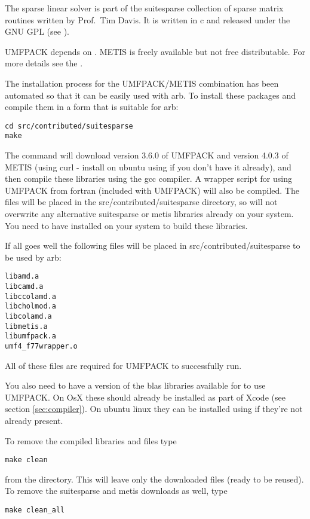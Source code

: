 The  sparse linear solver is part of the suitesparse collection of sparse matrix routines written by Prof.~Tim Davis.  It is written in c and released under the GNU GPL (see ).

UMFPACK depends on .  METIS is freely available but not free distributable.  For more details see the .

The installation process for the UMFPACK/METIS combination has been automated so that it can be easily used with arb.  To install these packages and compile them in a form that is suitable for arb:
%
\begin{verbatim}
cd src/contributed/suitesparse
make
\end{verbatim}

The  command will download version 3.6.0 of UMFPACK and version 4.0.3 of METIS (using curl - install on ubuntu using  if you don't have it already), and then compile these libraries using the gcc compiler.  A wrapper script for using UMFPACK from fortran (included with UMFPACK) will also be compiled.  The files will be placed in the src/contributed/suitesparse directory, so will not overwrite any alternative suitesparse or metis libraries already on your system.  You need to have  installed on your system to build these libraries.

If all goes well the following files will be placed in src/contributed/suitesparse to be used by arb:
\begin{verbatim}
libamd.a
libcamd.a
libccolamd.a
libcholmod.a
libcolamd.a
libmetis.a
libumfpack.a
umf4_f77wrapper.o
\end{verbatim}
All of these files are required for UMFPACK to successfully run.

You also need to have a version of the blas libraries available for  to use UMFPACK.  On OsX these should already be installed as part of Xcode (see section \ref{sec:compiler}).  On ubuntu linux they can be installed using  if they're not already present.

To remove the compiled libraries and files type
%
\begin{verbatim}
make clean
\end{verbatim}
%
from the  directory.  This will leave only the downloaded files (ready to be reused).  To remove the suitesparse and metis downloads as well, type
%
\begin{verbatim}
make clean_all
\end{verbatim}

